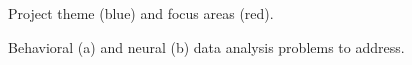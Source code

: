 \begin{figure}
    \begin{center}
        \resizebox{4.0in}{!}{%
            
        }
    \end{center}
    \caption{Project theme (blue) and focus areas (red).}
    \label{fig:focusAreas}
\end{figure}

\begin{figure}
    \centering
    \subfloat[]{
        \resizebox{3.0in}{!}{%
            
        }
    }
    \hfill
    \subfloat[]{
        \resizebox{3.0in}{!}{%
            
        }
    }
    \caption{Behavioral (a) and neural (b) data analysis problems to address.}
    \label{fig:dataAnalysis}
\end{figure}

